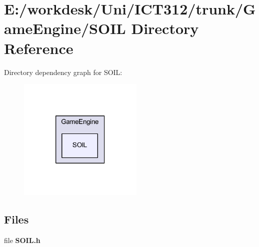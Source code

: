 \section{E\+:/workdesk/\+Uni/\+I\+C\+T312/trunk/\+Game\+Engine/\+S\+O\+I\+L Directory Reference}
\label{dir_e0e4d523e96f6088a44c8f2c0176524d}
Directory dependency graph for S\+O\+I\+L\+:\nopagebreak
\begin{figure}[H]
\begin{center}
\leavevmode
\includegraphics[width=169pt]{dir_e0e4d523e96f6088a44c8f2c0176524d_dep}
\end{center}
\end{figure}
\subsection*{Files}
\begin{DoxyCompactItemize}
\item 
file {\bf S\+O\+I\+L.\+h}
\end{DoxyCompactItemize}
